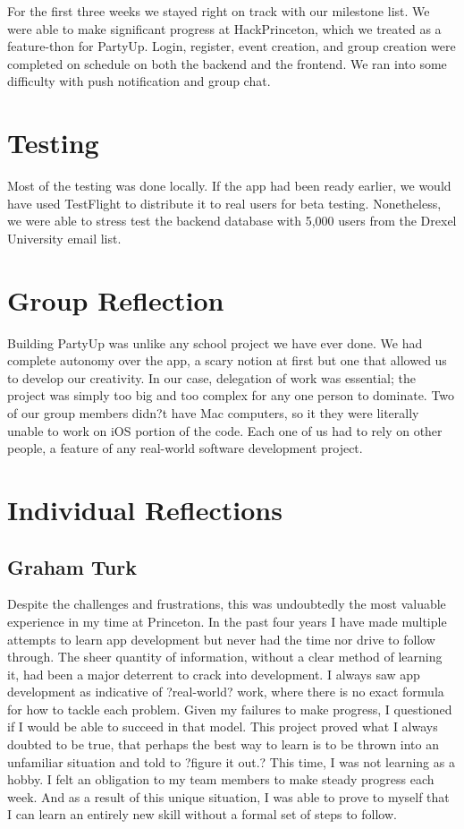 \documentclass[12pt]{article}
\begin{document}
For the first three weeks we stayed right on track with our milestone list. We were able to make significant progress at HackPrinceton, which we treated as a feature-thon for PartyUp. Login, register, event creation, and group creation were completed on schedule on both the backend and the frontend. We ran into some difficulty with push notification and group chat. 

\bigskip

\section{Testing}

Most of the testing was done locally. If the app had been ready earlier, we would have used TestFlight to distribute it to real users for beta testing. Nonetheless, we were able to stress test the backend database with 5,000 users from the Drexel University email list.

\section{Group Reflection}

Building PartyUp was unlike any school project we have ever done. We had complete autonomy over the app, a scary notion at first but one that allowed us to develop our creativity. In our case, delegation of work was essential; the project was simply too big and too complex for any one person to dominate. Two of our group members didn?t have Mac computers, so it they were literally unable to work on iOS portion of the code. Each one of us had to rely on other people, a feature of any real-world software development project. 

\bigskip

\section{Individual Reflections}

\subsection{Graham Turk}

Despite the challenges and frustrations, this was undoubtedly the most valuable experience in my time at Princeton. In the past four years I have made multiple attempts to learn app development but never had the time nor drive to follow through. The sheer quantity of information, without a clear method of learning it, had been a major deterrent to crack into development. I always saw app development as indicative of ?real-world? work, where there is no exact formula for how to tackle each problem. Given my failures to make progress, I questioned if I would be able to succeed in that model. This project proved what I always doubted to be true, that perhaps the best way to learn is to be thrown into an unfamiliar situation and told to ?figure it out.? This time, I was not learning as a hobby. I felt an obligation to my team members to make steady progress each week. And as a result of this unique situation, I was able to prove to myself that I can learn an entirely new skill without a formal set of steps to follow. 
\end{document}
